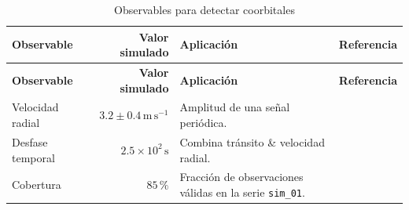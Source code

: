 \begin{longtable}{l r p{6.5cm} l}
  \caption[Observables de ejemplo]{Observables para detectar coorbitales}
  \label{tab:observables}\\
  \toprule
  \textbf{Observable} & \textbf{Valor simulado} & \textbf{Aplicación} & \textbf{Referencia} \\
  \midrule
  \endfirsthead
  \toprule
  \textbf{Observable} & \textbf{Valor simulado} & \textbf{Aplicación} & \textbf{Referencia} \\
  \midrule
  \endhead
  \bottomrule
  \endlastfoot
  Velocidad radial & $3.2 \pm 0.4\,\mathrm{m\,s^{-1}}$ & Amplitud de una señal periódica. & \cite{Leleu2015} \\
  Desfase temporal & $2.5 \times 10^2\,\mathrm{s}$ & Combina tránsito \& velocidad radial. & \citep[sección 2]{Leleu2017} \\
  Cobertura & $85\,\%$ & Fracción de observaciones válidas en la serie \texttt{sim\_01}. & \citeyear{Leleu2017} \\
\end{longtable}
